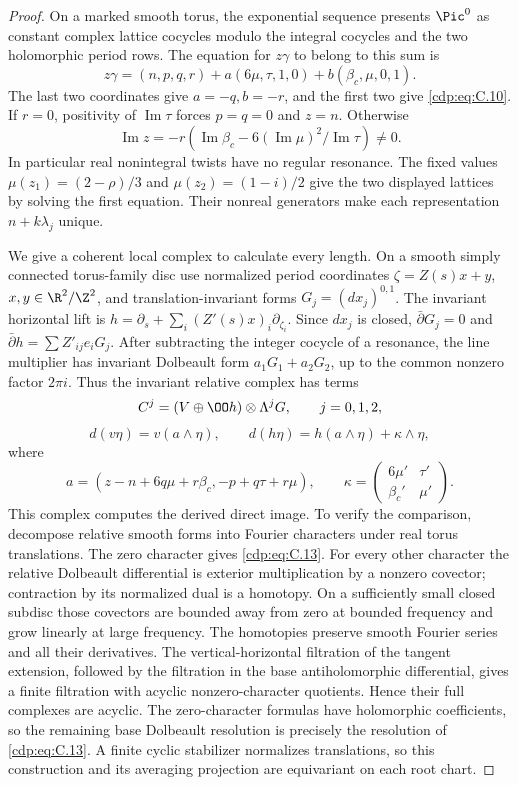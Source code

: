 \begin{proof}
On a marked smooth torus, the exponential sequence presents $\Pic^0$ as constant complex lattice cocycles modulo the integral cocycles and the two holomorphic period rows. The equation for $z\gamma$ to belong to this sum is
\[
 z\gamma=(n,p,q,r)+a(6\mu,\tau,1,0)+b(\beta_c,\mu,0,1).
\]
The last two coordinates give $a=-q,b=-r$, and the first two give \eqref{cdp:eq:C.10}. If $r=0$, positivity of $\operatorname{Im}\tau$ forces $p=q=0$ and $z=n$. Otherwise
\[
 \operatorname{Im}z=-r\left(\operatorname{Im}\beta_c-
           6(\operatorname{Im}\mu)^2/\operatorname{Im}\tau\right)\ne0.
\]
In particular real nonintegral twists have no regular resonance. The fixed values $\mu(z_1)=(2-\rho)/3$ and $\mu(z_2)=(1-i)/2$ give the two displayed lattices by solving the first equation. Their nonreal generators make each representation $n+k\lambda_j$ unique.

We give a coherent local complex to calculate every length. On a smooth simply connected torus-family disc use normalized period coordinates $\zeta=Z(s)x+y$, $x,y\in\R^2/\Z^2$, and translation-invariant forms $G_j=(dx_j)^{0,1}$. The invariant horizontal lift is $h=\partial_s+\sum_i(Z'(s)x)_i\partial_{\zeta_i}$. Since $dx_j$ is closed, $\bar\partial G_j=0$ and
$\bar\partial h=\sum Z'_{ij}e_iG_j$. After subtracting the integer cocycle of a resonance, the line multiplier has invariant Dolbeault form $a_1G_1+a_2G_2$, up to the common nonzero factor $2\pi i$. Thus the invariant relative complex has terms
\[
 C^j=(V\oplus\OO h)\otimes\Lambda^jG,\qquad j=0,1,2,
\]
\[
 d(v\eta)=v(a\wedge\eta),\qquad
 d(h\eta)=h(a\wedge\eta)+\kappa\wedge\eta,             \tag{C.13}\label{cdp:eq:C.13}
\]
where
\[
 a=(z-n+6q\mu+r\beta_c,-p+q\tau+r\mu),\qquad
 \kappa=\begin{pmatrix}6\mu'&\tau'\\\beta_c'&\mu'\end{pmatrix}.
\]
This complex computes the derived direct image. To verify the comparison, decompose relative smooth forms into Fourier characters under real torus translations. The zero character gives \eqref{cdp:eq:C.13}. For every other character the relative Dolbeault differential is exterior multiplication by a nonzero covector; contraction by its normalized dual is a homotopy. On a sufficiently small closed subdisc those covectors are bounded away from zero at bounded frequency and grow linearly at large frequency. The homotopies preserve smooth Fourier series and all their derivatives. The vertical-horizontal filtration of the tangent extension, followed by the filtration in the base antiholomorphic differential, gives a finite filtration with acyclic nonzero-character quotients. Hence their full complexes are acyclic. The zero-character formulas have holomorphic coefficients, so the remaining base Dolbeault resolution is precisely the resolution of \eqref{cdp:eq:C.13}. A finite cyclic stabilizer normalizes translations, so this construction and its averaging projection are equivariant on each root chart.


\end{proof}
